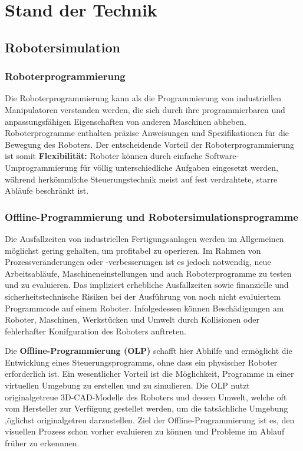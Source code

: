 \chapter{Stand der Technik} \label{cap:Grundlagen}

\section{Robotersimulation}
\subsection{Roboterprogrammierung} Die Roboterprogrammierung kann als die
Programmierung von industriellen Manipulatoren verstanden werden, die sich durch
ihre programmierbaren und anpassungsfähigen Eigenschaften von anderen Maschinen
abheben. Roboterprogramme enthalten präzise Anweisungen und Spezifikationen für
die Bewegung des Roboters.  Der entscheidende
Vorteil der Roboterprogrammierung ist somit \textbf{Flexibilität:} Roboter
können durch einfache Software-Umprogrammierung für völlig unterschiedliche
Aufgaben eingesetzt werden, während herkömmliche Steuerungstechnik meist auf
fest verdrahtete, starre Abläufe beschränkt ist.

\subsection{Offline-Programmierung und Robotersimulationsprogramme} Die
Ausfallzeiten von industriellen Fertigungsanlagen werden im Allgemeinen
möglichst gering gehalten, um profitabel zu operieren. Im Rahmen von
Prozessveränderungen oder -verbesserungen ist es jedoch notwendig, neue
Arbeitsabläufe, Maschineneinstellungen und auch Roboterprogramme zu testen und
zu evaluieren. Das impliziert erhebliche Ausfallzeiten sowie finanzielle und
sicherheitstechnische Risiken bei der Ausführung von noch nicht evaluiertem
Programmcode auf einem Roboter. Infolgedessen können Beschädigungen am
Roboter, Maschinen, Werkstücken und Umwelt durch Kollisionen oder fehlerhafter
Konifguration des Roboters auftreten.

Die \textbf{Offline-Programmierung (OLP)} schafft hier Abhilfe und ermöglicht
die Entwicklung eines Steuerungsprogramms, ohne dass ein physischer Roboter
erforderlich ist. Ein wesentlicher Vorteil ist die Möglichkeit, Programme in
einer virtuellen Umgebung zu erstellen und zu simulieren. Die OLP nutzt
originalgetreue 3D-CAD-Modelle des Roboters und dessen Umwelt, welche oft vom
Hersteller zur Verfügung gestellet werden, um die tatsächliche Umgebung
,öglichst originalgetreu darzustellen. Ziel der Offline-Programmierung ist es,
den visuellen Prozess schon vorher evaluieren zu können und Probleme im Ablauf
früher zu erkennnen. 

